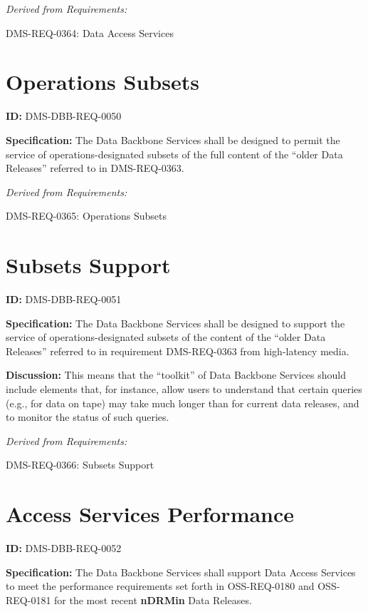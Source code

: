 \documentclass[SE,toc,lsstdraft]{lsstdoc}
\begin{document}
\emph{Derived from Requirements:}

DMS-REQ-0364:
Data Access Services \newline

\section{Operations Subsets}

\label{DMS-DBB-REQ-0050}
\textbf{ID:} DMS-DBB-REQ-0050

\textbf{Specification:}
The Data Backbone Services shall be designed to permit the service of operations-designated subsets of the full content of the “older Data Releases” referred to in DMS-REQ-0363.

\emph{Derived from Requirements:}

DMS-REQ-0365:
Operations Subsets \newline

\section{Subsets Support}

\label{DMS-DBB-REQ-0051}
\textbf{ID:} DMS-DBB-REQ-0051

\textbf{Specification:}
The Data Backbone Services shall be designed to support the service of operations-designated subsets of the content of the “older Data Releases” referred to in requirement DMS-REQ-0363 from high-latency media.

\textbf{Discussion:}
This means that the “toolkit” of Data Backbone Services should include elements that, for instance, allow users to understand that certain queries (e.g., for data on tape) may take much longer than for current data releases, and to monitor the status of such queries.

\emph{Derived from Requirements:}

DMS-REQ-0366:
Subsets Support \newline

\section{Access Services Performance}

\label{DMS-DBB-REQ-0052}
\textbf{ID:} DMS-DBB-REQ-0052

\textbf{Specification:}
The Data Backbone Services shall support Data Access Services to meet the performance requirements set forth in OSS-REQ-0180 and OSS-REQ-0181 for the most recent \textbf{nDRMin} Data Releases.
\end{document}

